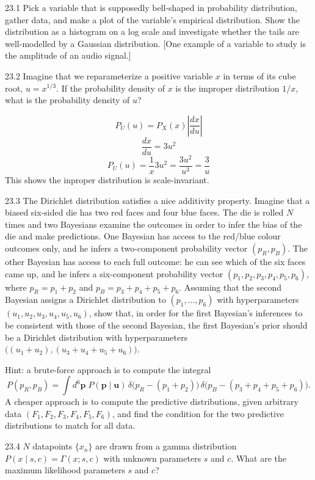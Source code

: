 \documentclass[12pt, a4paper]{article}
\begin{document}
\begin{prob}{23.1}
Pick a variable that is supposedly bell-shaped in probability distribution, gather data, and make a plot of the variable's empirical distribution. Show the distribution as a histogram on a log scale and investigate whether the tails are well-modelled by a Gaussian distribution. [One example of a variable to study is the amplitude of an audio signal.]
\end{prob}
\begin{sol}
\end{sol}
\bigskip

\begin{prob}{23.2}
Imagine that we reparameterize a positive variable $x$ in terms of its cube root, $u = x^{1/3}$. If the probability density of $x$ is the improper distribution $1/x$, what is the probability density of $u$?
\end{prob}
\begin{sol}
$$P_U(u) = P_X(x)\left| \frac{dx}{du} \right|$$
$$\frac{dx}{du} = 3u^2$$
$$P_U(u) = \frac{1}{x}3u^2 = \frac{3u^2}{u^3} = \frac{3}{u}$$
This shows the inproper distribution is scale-invariant.
\end{sol}
\bigskip

\begin{prob}{23.3}
The Dirichlet distribution satisfies a nice additivity property. Imagine that a biased six-sided die has two red faces and four blue faces. The die is rolled $N$ times and two Bayesians examine the outcomes in order to infer the bias of the die and make predictions. One Bayesian has access to the red/blue colour outcomes only, and he infers a two-component probability vector $(p_R, p_B)$. The other Bayesian has access to each full outcome: he can see which of the six faces came up, and he infers a six-component probability vector $(p_1, p_2, p_3, p_4, p_5, p_6)$, where $p_R = p_1 + p_2$ and $p_B = p_3 + p_4 + p_5 + p_6$. Assuming that the second Bayesian assigns a Dirichlet distribution to $(p_1, \ldots, p_6)$ with hyperparameters $(u_1, u_2, u_3, u_4, u_5, u_6)$, show that, in order for the first Bayesian's inferences to be consistent with those of the second Bayesian, the first Bayesian's prior should be a Dirichlet distribution with hyperparameters $\big((u_1 + u_2), (u_3 + u_4 + u_5 + u_6)\big)$.

Hint: a brute-force approach is to compute the integral
\[
P(p_R, p_B) = \int d^6\mathbf{p}\; P(\mathbf{p} \mid \mathbf{u})\, \delta\big(p_R - (p_1 + p_2)\big)\, \delta\big(p_B - (p_3 + p_4 + p_5 + p_6)\big).
\]
A cheaper approach is to compute the predictive distributions, given arbitrary data $(F_1, F_2, F_3, F_4, F_5, F_6)$, and find the condition for the two predictive distributions to match for all data.
\end{prob}
\begin{sol}
\end{sol}
\bigskip

\begin{prob}{23.4}
$N$ datapoints $\{x_n\}$ are drawn from a gamma distribution $P(x \mid s, c) = \Gamma(x; s, c)$ with unknown parameters $s$ and $c$. What are the maximum likelihood parameters $s$ and $c$?
\end{prob}
\begin{sol}
\end{sol}
\bigskip
\end{document}
